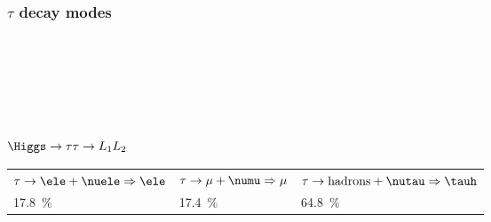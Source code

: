 \begin{frame}
\frametitle{$\tau$ decay modes}
~\hfill
\pause
\hfill
\pause
\hfill~

\vspace{5\baselineskip}

~\hfill

\hfill

\hfill~
\end{frame}

\begin{frame}
\frametitle{$\Higgs\to\tau\tau\to L_1L_2$}

\begin{tabularx}{\linewidth}{YYY}
$\tau\to\ele+\nuele\Rightarrow\ele$ & $\tau\to\mu+\numu\Rightarrow\mu$ & $\tau\to\text{hadrons}+\nutau\Rightarrow\tauh$\\
\SI{17.8}{\%} & \SI{17.4}{\%} & \SI{64.8}{\%}
\end{tabularx}

\pause
\vspace{\baselineskip}

\begin{center}

\qquad\pause

\end{center}
\end{frame}

